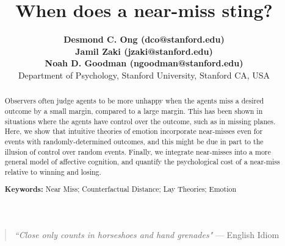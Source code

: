 \documentclass[10pt,letterpaper]{article}
\title{ When does a near-miss sting? }
\author{{\large \bf Desmond C. Ong (dco@stanford.edu)} \\
{\large \bf Jamil Zaki (jzaki@stanford.edu)} \\
{\large \bf Noah D. Goodman (ngoodman@stanford.edu)} \\
  Department of Psychology, Stanford University, Stanford CA, USA 
}
\begin{document}
\maketitle

\begin{abstract}
Observers often judge agents to be more unhappy when the agents miss a desired outcome by a small margin, compared to a large margin. This has been shown in situations where the agents have control over the outcome, such as in missing planes. Here, we show that intuitive theories of emotion incorporate near-misses even for events with randomly-determined outcomes, and this might be due in part to the illusion of control over random events. Finally, we integrate near-misses into a more general model of affective cognition, and quantify the psychological cost of a near-miss relative to winning and losing.


\textbf{Keywords:} 
Near Miss; Counterfactual Distance; Lay Theories; Emotion
\end{abstract}


\begin{quote}
\textit{``Close only counts in horseshoes and hand grenades"} 
--- English Idiom
\end{quote}

\end{document}
